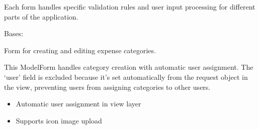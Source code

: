 \documentclass[letterpaper,10pt,english]{sphinxmanual}
\begin{document}
\sphinxAtStartPar
Each form handles specific validation rules and user input processing
for different parts of the application.

\begin{fulllineitems}
\label{\detokenize{expensesApp:expensesApp.froms.categoryForm}}
\pysigstartsignatures
\pysiglinewithargsret
{}
{\sphinxparamcomma {}\sphinxparamcomma {}\sphinxparamcomma {}\sphinxparamcomma {}\sphinxparamcomma {}\sphinxparamcomma {}\sphinxparamcomma {}\sphinxparamcomma {}\sphinxparamcomma {}\sphinxparamcomma {}}
{}
\pysigstopsignatures
\sphinxAtStartPar
Bases: 

\sphinxAtStartPar
Form for creating and editing expense categories.

\sphinxAtStartPar
This ModelForm handles category creation with automatic user assignment.
The ‘user’ field is excluded because it’s set automatically from the
request object in the view, preventing users from assigning categories
to other users.
\begin{description}
\begin{itemize}
\item {} 
\sphinxAtStartPar
Automatic user assignment in view layer

\item {} 
\sphinxAtStartPar
Supports icon image upload


\end{itemize}
\end{description}
\end{fulllineitems}
\end{document}
